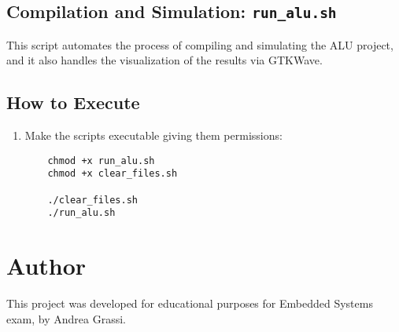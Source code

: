\documentclass{article}
\begin{document}
\subsection{Compilation and Simulation: \texttt{run\_alu.sh}}
This script automates the process of compiling and simulating the ALU project, and it also handles the visualization of the results via GTKWave.

\subsection{How to Execute}
\begin{enumerate}
    \item Make the scripts executable giving them permissions:
    \begin{verbatim}
    chmod +x run_alu.sh
    chmod +x clear_files.sh
    
    ./clear_files.sh
    ./run_alu.sh
    \end{verbatim}
\end{enumerate}

\section{Author}
This project was developed for educational purposes for Embedded Systems exam, by Andrea Grassi.
\end{document}
